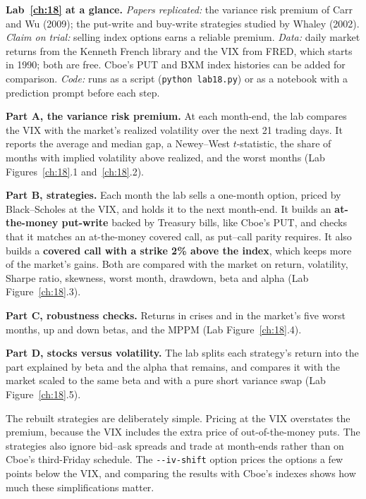 \begin{callout}
\textbf{Lab~\ref{ch:18} at a glance.} \emph{Papers replicated:} the variance risk premium of Carr and Wu (2009); the put-write and buy-write strategies studied by Whaley (2002). \emph{Claim on trial:} selling index options earns a reliable premium. \emph{Data:} daily market returns from the Kenneth French library and the VIX from FRED, which starts in 1990; both are free. Cboe's PUT and BXM index histories can be added for comparison. \emph{Code:} runs as a script (\texttt{python lab18.py}) or as a notebook with a prediction prompt before each step.
\end{callout}

\textbf{Part A, the variance risk premium.} At each month-end, the lab compares the VIX with the market's realized volatility over the next 21 trading days. It reports the average and median gap, a Newey--West $t$-statistic, the share of months with implied volatility above realized, and the worst months (Lab Figures~\ref{ch:18}.1 and~\ref{ch:18}.2).

\textbf{Part B, strategies.} Each month the lab sells a one-month option, priced by Black--Scholes at the VIX, and holds it to the next month-end. It builds an \textbf{at-the-money put-write} backed by Treasury bills, like Cboe's PUT, and checks that it matches an at-the-money covered call, as put--call parity requires. It also builds a \textbf{covered call with a strike 2\% above the index}, which keeps more of the market's gains. Both are compared with the market on return, volatility, Sharpe ratio, skewness, worst month, drawdown, beta and alpha (Lab Figure~\ref{ch:18}.3).

\textbf{Part C, robustness checks.} Returns in crises and in the market's five worst months, up and down betas, and the MPPM (Lab Figure~\ref{ch:18}.4).

\textbf{Part D, stocks versus volatility.} The lab splits each strategy's return into the part explained by beta and the alpha that remains, and compares it with the market scaled to the same beta and with a pure short variance swap (Lab Figure~\ref{ch:18}.5).

The rebuilt strategies are deliberately simple. Pricing at the VIX overstates the premium, because the VIX includes the extra price of out-of-the-money puts. The strategies also ignore bid--ask spreads and trade at month-ends rather than on Cboe's third-Friday schedule. The \texttt{-{}-iv-shift} option prices the options a few points below the VIX, and comparing the results with Cboe's indexes shows how much these simplifications matter.

